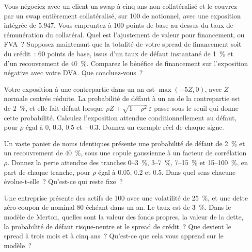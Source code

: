\begin{question}\label{iq:iv2:credit-and-xva:15}
Vous négociez avec un client un swap à cinq ans non collatéralisé et le couvrez par un swap entièrement collatéralisé, sur 100 de notionnel, avec une exposition intégrée de 5.947. Vous empruntez à 100 points de base au-dessus du taux de rémunération du collatéral. Quel est l'ajustement de valeur pour financement, ou FVA~? Supposez maintenant que la totalité de votre spread de financement soit du crédit~: 60 points de base, issus d'un taux de défaut instantané de 1~\% et d'un recouvrement de 40~\%. Comparez le bénéfice de financement sur l'exposition négative avec votre DVA. Que concluez-vous~?
\end{question}

\begin{question}\label{iq:iv2:credit-and-xva:16}
Votre exposition à une contrepartie dans un an est $\max(-5Z, 0)$, avec $Z$ normale centrée réduite. La probabilité de défaut à un an de la contrepartie est de 2~\%, et elle fait défaut lorsque $\rho Z + \sqrt{1 - \rho^2}\,\varepsilon$ passe sous le seuil qui donne cette probabilité. Calculez l'exposition attendue conditionnellement au défaut, pour $\rho$ égal à 0, 0.3, 0.5 et $-0.3$. Donnez un exemple réel de chaque signe.
\end{question}

\begin{question}\label{iq:iv2:credit-and-xva:17}
Un vaste panier de noms identiques présente une probabilité de défaut de 2~\% et un recouvrement de 40~\%, sous une copule gaussienne à un facteur de corrélation $\rho$. Donnez la perte attendue des tranches 0--3~\%, 3--7~\%, 7--15~\% et 15--100~\%, en part de chaque tranche, pour $\rho$ égal à 0.05, 0.2 et 0.5. Dans quel sens chacune évolue-t-elle~? Qu'est-ce qui reste fixe~?
\end{question}

\begin{question}\label{iq:iv2:credit-and-xva:18}
Une entreprise présente des actifs de 100 avec une volatilité de 25~\%, et une dette zéro-coupon de nominal 80 échéant dans un an. Le taux est de 3~\%. Dans le modèle de Merton, quelles sont la valeur des fonds propres, la valeur de la dette, la probabilité de défaut risque-neutre et le spread de crédit~? Que devient le spread à trois mois et à cinq ans~? Qu'est-ce que cela vous apprend sur le modèle~?
\end{question}

